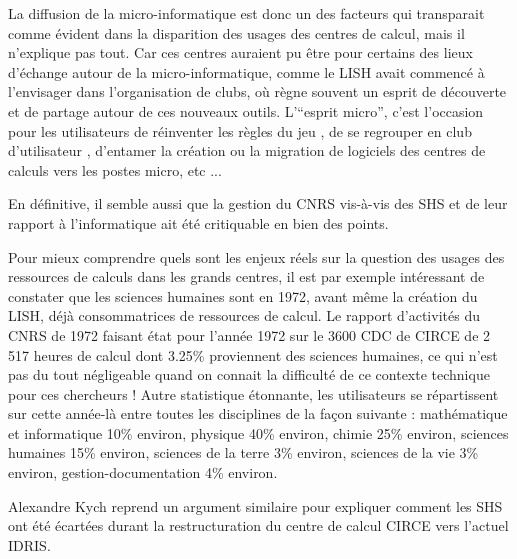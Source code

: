La diffusion de la micro-informatique est donc un des facteurs qui transparait comme évident dans la disparition des usages des centres de calcul, mais il n'explique pas tout. Car ces centres auraient pu être pour certains des lieux d'échange autour de la micro-informatique, comme le LISH avait commencé à l'envisager dans l'organisation de clubs, où règne souvent un esprit de découverte et de partage autour de ces nouveaux outils. L'\enquote{esprit micro}, c'est l'occasion pour les utilisateurs de réinventer les règles du jeu , de se regrouper en club d'utilisateur \autocite[57]{LISH1984}, d'entamer la création ou la migration de logiciels des centres de calculs vers les postes micro, etc ...

En définitive, il semble aussi que la gestion du CNRS vis-à-vis des SHS et de leur rapport à l'informatique ait été critiquable en bien des points.

Pour mieux comprendre quels sont les enjeux réels sur la question des usages des ressources de calculs dans les grands centres, il est par exemple intéressant de constater que les sciences humaines sont en 1972, avant même la création du LISH, déjà consommatrices de ressources de calcul. Le rapport d’activités du CNRS de 1972 faisant état pour l’année 1972 sur le 3600 CDC de CIRCE de 2 517 heures de calcul dont 3.25\% proviennent des sciences humaines, ce qui n’est pas du tout négligeable quand on connait la difficulté de ce contexte technique pour ces chercheurs ! Autre statistique étonnante, les utilisateurs se répartissent sur cette année-là entre toutes les disciplines  de la façon suivante : mathématique et informatique 10\% environ, physique 40\% environ, chimie 25\% environ, sciences humaines 15\% environ, sciences de la terre 3\% environ, sciences de la vie 3\% environ, gestion-documentation 4\% environ.

Alexandre Kych reprend un argument similaire  pour expliquer comment les SHS ont été écartées durant la restructuration du centre de calcul CIRCE vers l'actuel IDRIS.

